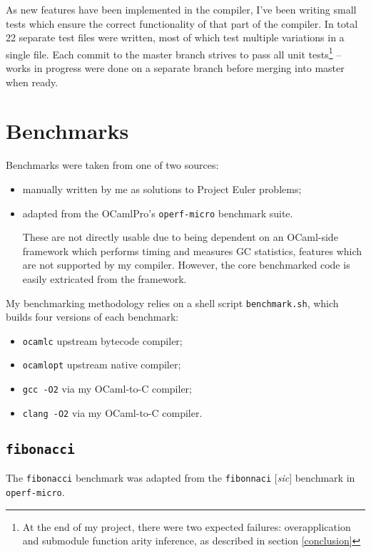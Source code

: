 \documentclass[12pt,a4paper,twoside,openright]{report}
\begin{document}
As new features have been implemented in the compiler, I've been writing small
tests which ensure the correct functionality of that part of the compiler. In
total 22 separate test files were written, most of which test multiple
variations in a single file. Each commit to the master branch strives to pass
all unit tests\footnote{At the end of my project, there were two expected
  failures: overapplication and submodule function arity inference, as
  described in section \ref{conclusion}}
-- works in progress were done on a separate branch before merging into master
when ready.

\section{Benchmarks}

Benchmarks were taken from one of two sources:

\begin{itemize}
    \item manually written by me as solutions to Project Euler problems;
    \item adapted from the OCamlPro's \lstinline!operf-micro! benchmark suite.

    These are not directly usable due to being dependent on an OCaml-side
    framework which performs timing and measures GC statistics, features which
    are not supported by my compiler. However, the core benchmarked code is
    easily extricated from the framework.
\end{itemize}

My benchmarking methodology relies on a shell script \lstinline!benchmark.sh!,
which builds four versions of each benchmark:

\begin{itemize}
    \item \lstinline!ocamlc! upstream bytecode compiler;
    \item \lstinline!ocamlopt! upstream native compiler;
    \item \lstinline!gcc -O2! via my OCaml-to-C compiler;
    \item \lstinline!clang -O2! via my OCaml-to-C compiler.
\end{itemize}


\subsection{\texttt{fibonacci}}

The \lstinline!fibonacci! benchmark was adapted from the \lstinline!fibonnaci!
[\textit{sic}] benchmark in \lstinline!operf-micro!.
\end{document}
